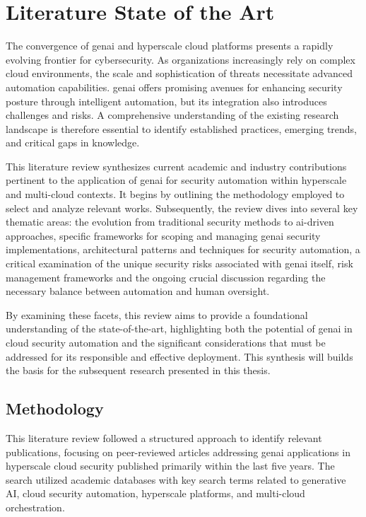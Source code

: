 \section{Literature State of the Art} %
\label{sec:State-of-the-Art}

The convergence of \gls{genai} and hyperscale cloud platforms presents a rapidly evolving frontier for cybersecurity. As organizations increasingly rely on complex cloud environments, the scale and sophistication of threats necessitate advanced automation capabilities. \gls{genai} offers promising avenues for enhancing security posture through intelligent automation, but its integration also introduces challenges and risks. A comprehensive understanding of the existing research landscape is therefore essential to identify established practices, emerging trends, and critical gaps in knowledge.

This literature review synthesizes current academic and industry contributions pertinent to the application of \gls{genai} for security automation within hyperscale and multi-cloud contexts. It begins by outlining the methodology employed to select and analyze relevant works. Subsequently, the review dives into several key thematic areas: the evolution from traditional security methods to \gls{ai}-driven approaches, specific frameworks for scoping and managing \gls{genai} security implementations, architectural patterns and techniques for security automation, a critical examination of the unique security risks associated with \gls{genai} itself, risk management frameworks and the ongoing crucial discussion regarding the necessary balance between automation and human oversight.

By examining these facets, this review aims to provide a foundational understanding of the state-of-the-art, highlighting both the potential of \gls{genai} in cloud security automation and the significant considerations that must be addressed for its responsible and effective deployment. This synthesis will builds the basis for the subsequent research presented in this thesis.

\subsection{Methodology} %
\label{sec:Methodology}

This literature review followed a structured approach to identify relevant publications, focusing on peer-reviewed articles addressing \gls{genai} applications in hyperscale cloud security published primarily within the last five years. The search utilized academic databases with key search terms related to generative AI, cloud security automation, hyperscale platforms, and multi-cloud orchestration.

